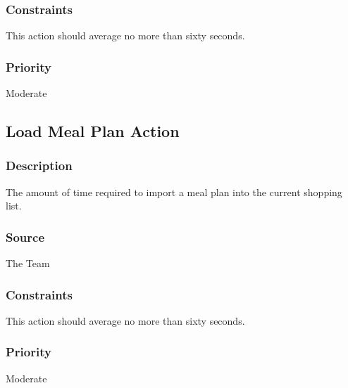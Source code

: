 \subsubsection{Constraints}
This action should average no more than sixty seconds.
\subsubsection{Priority}
Moderate

\subsection{Load Meal Plan Action}
\subsubsection{Description}
The amount of time required to import a meal plan into the current shopping list.
\subsubsection{Source}
The Team
\subsubsection{Constraints}
This action should average no more than sixty seconds.
\subsubsection{Priority}
Moderate